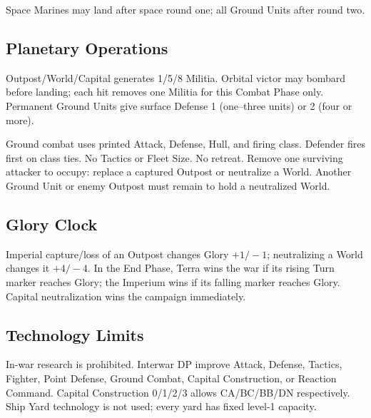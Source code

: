 Space Marines may land after space round one; all Ground Units after round two.

\subsection{Planetary Operations}

Outpost/World/Capital generates 1/5/8 Militia. Orbital victor may bombard before
landing; each hit removes one Militia for this Combat Phase only. Permanent
Ground Units give surface Defense 1 (one--three units) or 2 (four or more).

Ground combat uses printed Attack, Defense, Hull, and firing class. Defender
fires first on class ties. No Tactics or Fleet Size. No retreat. Remove one
surviving attacker to occupy: replace a captured Outpost or neutralize a World.
Another Ground Unit or enemy Outpost must remain to hold a neutralized World.

\subsection{Glory Clock}

Imperial capture/loss of an Outpost changes Glory $+1/-1$; neutralizing a World
changes it $+4/-4$. In the End Phase, Terra wins the war if its rising Turn
marker reaches Glory; the Imperium wins if its falling marker reaches Glory.
Capital neutralization wins the campaign immediately.

\subsection{Technology Limits}

In-war research is prohibited. Interwar DP improve Attack, Defense, Tactics,
Fighter, Point Defense, Ground Combat, Capital Construction, or Reaction
Command. Capital Construction 0/1/2/3 allows CA/BC/BB/DN respectively.
Ship Yard technology is not used; every yard has fixed level-1 capacity.
